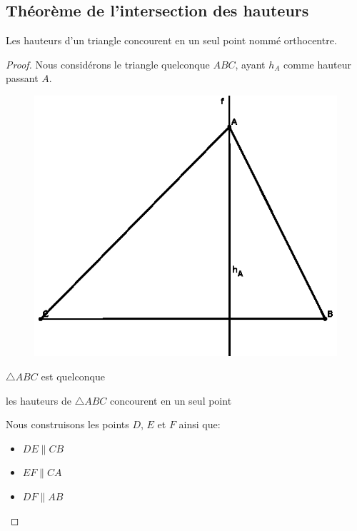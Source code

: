 \documentclass[a4paper,12pt]{article}
\begin{document}
\pagebreak
\subsection{Théorème de l'intersection des hauteurs}
\begin{theorem}
Les hauteurs d'un triangle concourent en un seul point nommé orthocentre.
\end{theorem}

\begin{proof}
Nous considérons le triangle quelconque $ABC$, ayant $h_A$ comme hauteur passant $A$.

\begin{figure}[H]
        \centering
        \includegraphics[scale=1]{hauteur1.eps}
    \end{figure}
    
    
\begin{hyp}
$\triangle ABC$ est quelconque
\end{hyp}
\begin{concl}
les hauteurs de $\triangle ABC$ concourent en un seul point
\end{concl}
Nous construisons les points $D$, $E$ et $F$ ainsi que:
\begin{itemize}
    \item $DE \parallel CB$
    \item $EF \parallel CA$
    \item $DF \parallel AB$
\end{itemize}


\end{proof}
\end{document}
